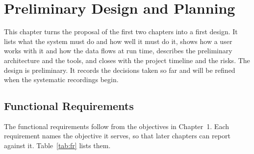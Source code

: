 \chapter{Preliminary Design and Planning}
This chapter turns the proposal of the first two chapters into a first design. It lists what the system must do and how well it must do it, shows how a user works with it and how the data flows at run time, describes the preliminary architecture and the tools, and closes with the project timeline and the risks. The design is preliminary. It records the decisions taken so far and will be refined when the systematic recordings begin.

\section{Functional Requirements}
The functional requirements follow from the objectives in Chapter~1. Each requirement names the objective it serves, so that later chapters can report against it. Table~\ref{tab:fr} lists them.

